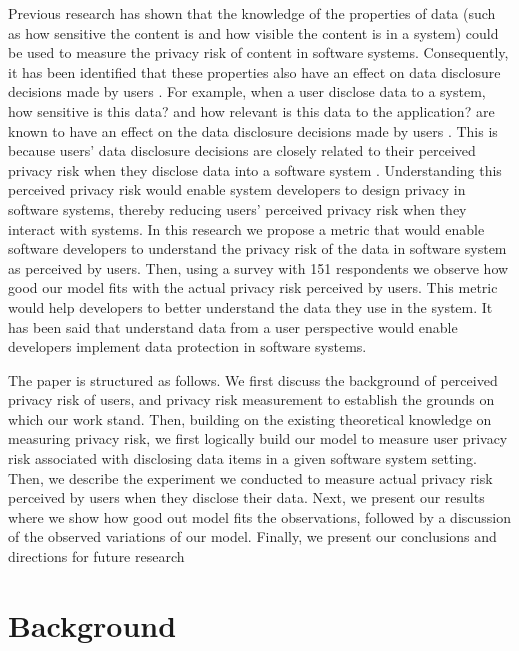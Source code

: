 \documentclass[10pt]{article}
\begin{document}
Previous research has shown that the knowledge of the properties of data (such as how sensitive the content is and how visible the content is in a system) could be used \cite {maximilien2009privacy} to measure the privacy risk of content in software systems. Consequently, it has been identified that these properties also have an effect on data disclosure decisions made by users \cite {malheiros2013fairly}. For example, when a user disclose data to a system, how sensitive is this data? and how relevant is this data to the application? are known to have an effect on the data disclosure decisions made by users \cite {malheiros2013fairly}. This is because users' data disclosure decisions are closely related to their perceived privacy risk when they disclose data into a software system \cite {kobsa2007privacy, li2010understanding, malhotra2004internet}. Understanding this perceived privacy risk would enable system developers to design privacy in software systems, thereby reducing users' perceived privacy risk when they interact with systems. In this research we propose a metric that would enable software developers to understand the privacy risk of the data in software system as perceived by users. Then, using a survey with 151 respondents we observe how good our model fits with the actual privacy risk perceived by users. This metric would help developers to better understand the data they use in the system. It has been said that understand data from a user perspective would enable developers implement data protection in software systems\cite {marr2015big}.

The paper is structured as follows. We first discuss the background of perceived privacy risk of users, and privacy risk measurement to establish the grounds on which our work stand. Then, building on the existing theoretical knowledge on measuring privacy risk, we first logically build our model to measure user privacy risk associated with disclosing data items in a given software system setting. Then, we describe the experiment we conducted to measure actual privacy risk perceived by users when they disclose their data. Next, we present our results where we show how good out model fits the observations, followed by a discussion of the observed variations of our model. Finally, we present our conclusions and directions for future research

\section {Background}
\end{document}
